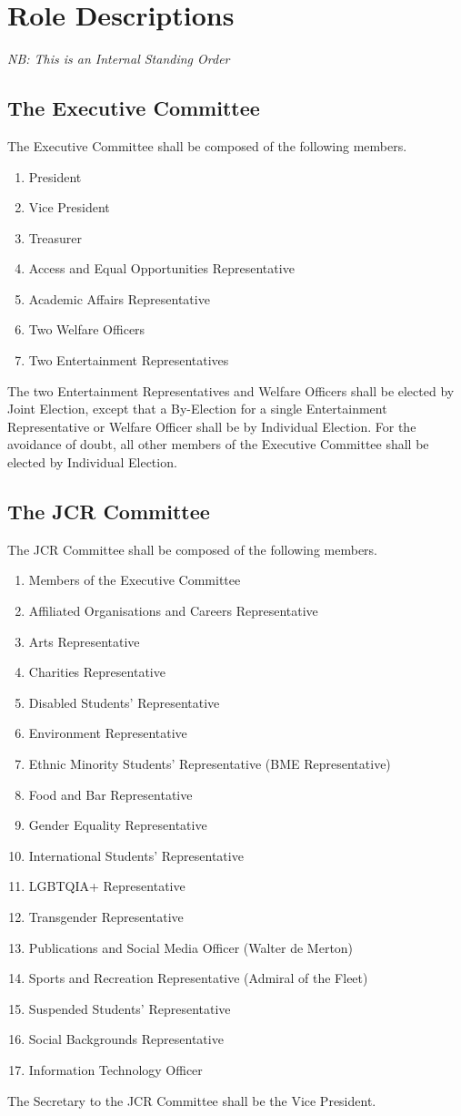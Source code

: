 \chapter{Role Descriptions}
\textit{NB: This is an Internal Standing Order}
\section{The Executive Committee}
\npara The Executive Committee shall be composed of the following members.
\begin{enumerate}
	\item President
	\item Vice President
	\item Treasurer
	\item Access and Equal Opportunities Representative
	\item Academic Affairs Representative
	\item Two Welfare Officers
	\item Two Entertainment Representatives
\end{enumerate}
\npara The two Entertainment Representatives and Welfare Officers shall be elected by Joint Election, except that a By-Election for a single Entertainment Representative or Welfare Officer shall be by Individual Election. For the avoidance of doubt, all other members of the Executive Committee shall be elected by Individual Election. 
\section{The JCR Committee}
\npara The JCR Committee shall be composed of the following members.
\begin{enumerate}
	\item Members of the Executive Committee
	\item Affiliated Organisations and Careers Representative
	\item Arts Representative
	\item Charities Representative
	\item Disabled Students' Representative
	\item Environment Representative
	\item Ethnic Minority Students' Representative (BME Representative)
	\item Food and Bar Representative
	\item Gender Equality Representative
	\item International Students' Representative
	\item LGBTQIA+ Representative
	\item Transgender Representative
	\item Publications and Social Media Officer (Walter de Merton)
	\item Sports and Recreation Representative (Admiral of the Fleet)
	\item Suspended Students' Representative
	\item Social Backgrounds Representative
	\item Information Technology Officer
\end{enumerate}
\npara The Secretary to the JCR Committee shall be the Vice President.
